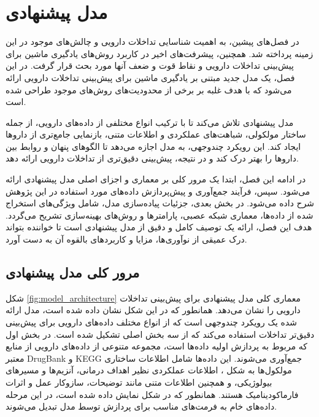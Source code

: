 \chapter{مدل پیشنهادی}

در فصل‌های پیشین، به اهمیت شناسایی تداخلات دارویی و چالش‌های موجود در این زمینه پرداخته شد. همچنین، پیشرفت‌های اخیر در کاربرد روش‌های یادگیری ماشین برای پیش‌بینی تداخلات دارویی و نقاط قوت و ضعف آنها مورد بحث قرار گرفت. در این فصل، یک مدل جدید مبتنی بر یادگیری ماشین برای پیش‌بینی تداخلات دارویی ارائه می‌شود که با هدف غلبه بر برخی از محدودیت‌های روش‌های موجود طراحی شده است.

مدل پیشنهادی تلاش می‌کند تا با ترکیب انواع مختلفی از داده‌های دارویی، از جمله ساختار مولکولی، شباهت‌های عملکردی و اطلاعات متنی، بازنمایی جامع‌تری از داروها ایجاد کند. این رویکرد چندوجهی، به مدل اجازه می‌دهد تا الگوهای پنهان و روابط بین داروها را بهتر درک کند و در نتیجه، پیش‌بینی دقیق‌تری از تداخلات دارویی ارائه دهد.

در ادامه این فصل، ابتدا یک مرور کلی بر معماری و اجزای اصلی مدل پیشنهادی ارائه می‌شود. سپس، فرآیند جمع‌آوری و پیش‌پردازش داده‌های مورد استفاده در این پژوهش شرح داده می‌شود. در بخش بعدی، جزئیات پیاده‌سازی مدل، شامل ویژگی‌های استخراج شده از داده‌ها، معماری شبکه عصبی، پارامترها و روش‌های بهینه‌سازی تشریح می‌گردد. هدف این فصل، ارائه یک توصیف کامل و دقیق از مدل پیشنهادی است تا خواننده بتواند درک عمیقی از نوآوری‌ها، مزایا و کاربردهای بالقوه آن به دست آورد.

\section{مرور کلی مدل پیشنهادی}

شکل \ref{fig:model_architecture} معماری کلی مدل پیشنهادی برای پیش‌بینی تداخلات دارویی را نشان می‌دهد. همانطور که در این شکل نشان داده شده است، مدل ارائه شده یک رویکرد چندوجهی است که از انواع مختلف داده‌های دارویی برای پیش‌بینی دقیق‌تر تداخلات استفاده می‌کند که از سه بخش اصلی تشکیل شده است. در بخش اول که مربوط به پردازش اولیه داده‌ها است، مجموعه متنوعی از داده‌های دارویی از منابع معتبر DrugBank و KEGG جمع‌آوری می‌شوند. این داده‌ها شامل اطلاعات ساختاری مولکول‌ها به شکل ، اطلاعات عملکردی نظیر اهداف درمانی، آنزیم‌ها و مسیرهای بیولوژیکی، و همچنین اطلاعات متنی مانند توضیحات، سازوکار عمل و اثرات فارماکودینامیک هستند. همانطور که در شکل نمایش داده شده است، در این مرحله داده‌های خام به فرمت‌های مناسب برای پردازش توسط مدل تبدیل می‌شوند.

